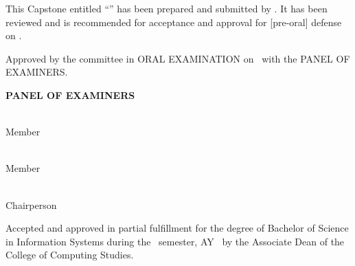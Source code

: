 \clearpage
{}

\noindent This Capstone entitled ``\CapstoneTitleShort'' has been prepared and submitted by \ResearcherNames. It has been reviewed and is recommended for acceptance and approval for [pre-oral] defense on \DefenseDate.


\vspace{12pt}
\noindent Approved by the committee in ORAL EXAMINATION on \DefenseDate\ with the PANEL OF EXAMINERS.

\begin{center}\bfseries PANEL OF EXAMINERS\end{center}
\vspace{6pt}
\noindent\begin{minipage}[t]{0.5\textwidth}\centering\underline{\PanelOne}\\ Member\end{minipage}%
\begin{minipage}[t]{0.5\textwidth}\centering\underline{\PanelTwo}\\ Member\end{minipage}

\vspace{14pt}
\begin{center}\underline{\PanelChair}\\ Chairperson\end{center}

\vspace{6pt}
\noindent Accepted and approved in partial fulfillment for the degree of Bachelor of Science in Information Systems during the \Semester\ semester, AY \SchoolYear\ by the Associate Dean of the College of Computing Studies.


